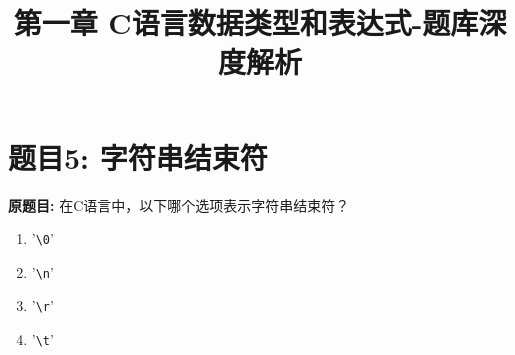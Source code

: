 \documentclass[a4paper,12pt]{article}
\title{\textbf{第一章 C语言数据类型和表达式-题库深度解析}}
\author{}
\date{}
\begin{document}
\maketitle

\tableofcontents
\newpage

\section*{题目5: 字符串结束符}

\textbf{原题目:}
在C语言中，以下哪个选项表示字符串结束符？
\begin{enumerate}
	\item[A)] '\texttt{\textbackslash0}'
	\item[B)] '\texttt{\textbackslash n}'
	\item[C)] '\texttt{\textbackslash r}'
	\item[D)] '\texttt{\textbackslash t}'
\end{enumerate}
\end{document}

